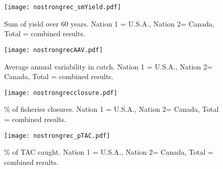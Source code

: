 \documentclass[a4paper]{article}
\begin{document}
\begin{center} %
\begin{figure}[H]               
    \texttt{[image: nostrongrec\_smYield.pdf]}  
	\caption{ Sum of yield over 60 years. Nation 1 = U.S.A., Nation 2= Canada, Total =  combined results. }                
\end{figure}
\end{center}


\begin{center} %
\begin{figure}[H]               
    \texttt{[image: nostrongrecAAV.pdf]}  
	\caption{Average annual variability in catch.  Nation 1 = U.S.A., Nation 2= Canada, Total =  combined results.}                
\end{figure}
\end{center}

\begin{center} %
\begin{figure}[H]               
    \texttt{[image: nostrongrecclosure.pdf]}  
    \caption{ \% of fisheries closures.  Nation 1 = U.S.A., Nation 2= Canada, Total =  combined results.}                
\end{figure}
\end{center}



\begin{center} %
\begin{figure}[H]               
    \texttt{[image: nostrongrec\_pTAC.pdf]}  
    \caption{ \% of TAC caught.  Nation 1 = U.S.A., Nation 2= Canada, Total =  combined results.}                
\end{figure}
\end{center}
\end{document}
